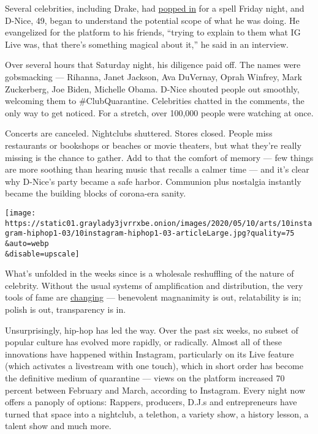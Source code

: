 Several celebrities, including Drake, had
\href{https://www.instagram.com/p/B9_9bGCAcS1/?utm_source=ig_embed}{popped
in} for a spell Friday night, and D-Nice, 49, began to understand the
potential scope of what he was doing. He evangelized for the platform to
his friends, ``trying to explain to them what IG Live was, that there's
something magical about it,'' he said in an interview.

Over several hours that Saturday night, his diligence paid off. The
names were gobsmacking --- Rihanna, Janet Jackson, Ava DuVernay, Oprah
Winfrey, Mark Zuckerberg, Joe Biden, Michelle Obama. D-Nice shouted
people out smoothly, welcoming them to \#ClubQuarantine. Celebrities
chatted in the comments, the only way to get noticed. For a stretch,
over 100,000 people were watching at once.

Concerts are canceled. Nightclubs shuttered. Stores closed. People miss
restaurants or bookshops or beaches or movie theaters, but what they're
really missing is the chance to gather. Add to that the comfort of
memory --- few things are more soothing than hearing music that recalls
a calmer time --- and it's clear why D-Nice's party became a safe
harbor. Communion plus nostalgia instantly became the building blocks of
corona-era sanity.

\texttt{[image: https://static01.graylady3jvrrxbe.onion/images/2020/05/10/arts/10instagram-hiphop1-03/10instagram-hiphop1-03-articleLarge.jpg?quality=75\\\&auto=webp\\\&disable=upscale]}

What's unfolded in the weeks since is a wholesale reshuffling of the
nature of celebrity. Without the usual systems of amplification and
distribution, the very tools of fame are
\href{https://www.nytimes3xbfgragh.onion/2020/03/30/arts/virus-celebrities.html}{changing}
--- benevolent magnanimity is out, relatability is in; polish is out,
transparency is in.

Unsurprisingly, hip-hop has led the way. Over the past six weeks, no
subset of popular culture has evolved more rapidly, or radically. Almost
all of these innovations have happened within Instagram, particularly on
its Live feature (which activates a livestream with one touch), which in
short order has become the definitive medium of quarantine --- views on
the platform increased 70 percent between February and March, according
to Instagram. Every night now offers a panoply of options: Rappers,
producers, D.J.s and entrepreneurs have turned that space into a
nightclub, a telethon, a variety show, a history lesson, a talent show
and much more.


